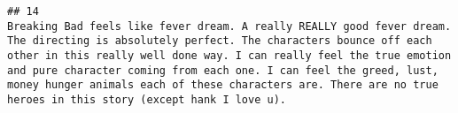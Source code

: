 \documentclass[
]{article}
\begin{document}
\begin{verbatim}
## 14                                                                                                                                                                                                                                                                                                                                                                                                                                                                                                                                                                                                                                                                                                                                                                                                                                                                                                                                                                                                                                                                                                                                                                                                                                                                                                                                                                                                                                                                                                                                                                                                                                                                                                                                                                                                         Breaking Bad feels like fever dream. A really REALLY good fever dream. The directing is absolutely perfect. The characters bounce off each other in this really well done way. I can really feel the true emotion and pure character coming from each one. I can feel the greed, lust, money hunger animals each of these characters are. There are no true heroes in this story (except hank I love u).

\end{verbatim}
\end{document}
